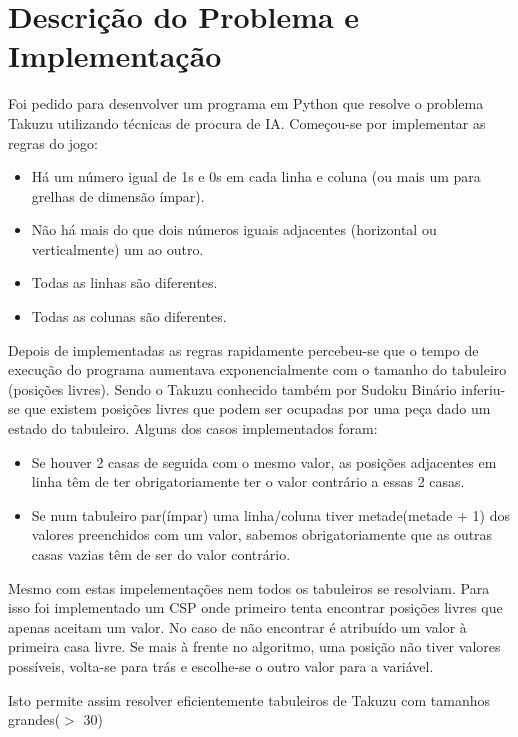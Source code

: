 \documentclass[12pt,a4paper]{article}
\begin{document}
  \section{Descrição do Problema e Implementação}

  Foi pedido para desenvolver um programa em Python que resolve o problema Takuzu utilizando técnicas de procura de IA.
  Começou-se por implementar as regras do jogo:

  \begin{itemize}
    \setlength{\itemsep}{0pt}
    \item Há um número igual de 1s e 0s em cada linha e coluna (ou mais um para grelhas de
    dimensão ímpar).
    \item Não há mais do que dois números iguais adjacentes (horizontal ou verticalmente) um ao
    outro.
    \item Todas as linhas são diferentes.
    \item Todas as colunas são diferentes.
  \end{itemize}

  Depois de implementadas as regras rapidamente percebeu-se que o tempo de execução do programa aumentava exponencialmente com o tamanho do tabuleiro (posições livres).
  Sendo o Takuzu conhecido também por Sudoku Binário inferiu-se que existem posições livres que podem ser ocupadas por uma peça dado um estado do tabuleiro. 
  Alguns dos casos implementados foram:
  \begin{itemize}
    \setlength{\itemsep}{0pt}
    \item Se houver 2 casas de seguida com o mesmo valor, as posições adjacentes em linha têm de ter obrigatoriamente ter o valor contrário a essas 2 casas.
    \item Se num tabuleiro par(ímpar) uma linha/coluna tiver metade(metade + 1) dos valores preenchidos com um valor, sabemos obrigatoriamente que as outras casas vazias têm de ser do valor contrário. 
  \end{itemize}

  Mesmo com estas impelementações nem todos os tabuleiros se resolviam.
  Para isso foi implementado um CSP onde primeiro tenta encontrar posições livres que apenas aceitam um valor.
  No caso de não encontrar é atribuído um valor à primeira casa livre.
  Se mais à frente no algoritmo, uma posição não tiver valores possíveis, volta-se para trás e escolhe-se o outro valor para a variável.

  Isto permite assim resolver eficientemente tabuleiros de Takuzu com tamanhos grandes($>$ 30)
  
\end{document}
